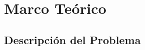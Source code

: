 \documentclass[fleqn,10pt]{SelfArx} %
\begin{document}

\section{Marco Teórico}

\subsection{Descripción del Problema}

\end{document}
